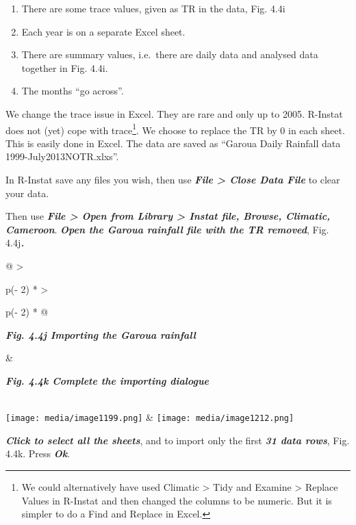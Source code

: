 \documentclass[
  letterpaper,
  DIV=11,
  numbers=noendperiod]{scrreprt}
\begin{document}
\begin{enumerate}
\def\labelenumi{\arabic{enumi}.}
\item
  There are some trace values, given as TR in the data, Fig. 4.4i
\item
  Each year is on a separate Excel sheet.
\item
  There are summary values, i.e.~there are daily data and analysed data
  together in Fig. 4.4i.
\item
  The months ``go across''.
\end{enumerate}

We change the trace issue in Excel. They are rare and only up to 2005.
R-Instat does not (yet) cope with trace\footnote{We could alternatively
  have used Climatic \textgreater{} Tidy and Examine \textgreater{}
  Replace Values in R-Instat and then changed the columns to be numeric.
  But it is simpler to do a Find and Replace in Excel.}. We choose to
replace the TR by 0 in each sheet. This is easily done in Excel. The
data are saved as ``Garoua Daily Rainfall data 1999-July2013NOTR.xlxs''.

In R-Instat save any files you wish, then use \textbf{\emph{File
\textgreater{} Close Data File}} to clear your data.

Then use \textbf{\emph{File \textgreater{} Open from Library
\textgreater{} Instat file, Browse, Climatic, Cameroon}}.
\textbf{\emph{Open the Garoua rainfall file with the TR removed}}, Fig.
4.4j\textbf{\emph{.}}

\begin{longtable}[]{@{}
  >{\raggedright\arraybackslash}p{(\columnwidth - 2\tabcolsep) * }
  >{\raggedright\arraybackslash}p{(\columnwidth - 2\tabcolsep) * }@{}}
\toprule\noalign{}
\begin{minipage}[b]{\linewidth}\raggedright
\textbf{\emph{Fig. 4.4j Importing the Garoua rainfall}}
\end{minipage} & \begin{minipage}[b]{\linewidth}\raggedright
\textbf{\emph{Fig. 4.4k Complete the importing dialogue}}
\end{minipage} \\
\midrule\noalign{}
\endhead
\bottomrule\noalign{}
\endlastfoot
\texttt{[image: media/image1199.png]}
&
\texttt{[image: media/image1212.png]} \\
\end{longtable}

\textbf{\emph{Click to select all the sheets}}, and to import only the
first \textbf{\emph{31 data rows}}, Fig. 4.4k. Press \textbf{\emph{Ok}}.
\end{document}
